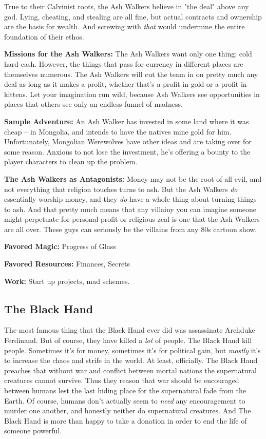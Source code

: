 True to their Calvinist roots, the Ash Walkers believe in "the deal" above any god. Lying, cheating, and stealing are all fine, but actual contracts and ownership are the basis for wealth. And screwing with \textit{that} would undermine the entire foundation of their ethos.

\textbf{Missions for the Ash Walkers:} The Ash Walkers want only one thing: cold hard cash. However, the things that pass for currency in different places are themselves numerous. The Ash Walkers will cut the team in on pretty much any deal as long as it makes a profit, whether that's a profit in gold or a profit in kittens. Let your imagination run wild, because Ash Walkers see opportunities in places that others see only an endless funnel of madness.

\textbf{Sample Adventure:} An Ash Walker has invested in some land where it was cheap -- in Mongolia, and intends to have the natives mine gold for him. Unfortunately, Mongolian Werewolves have other ideas and are taking over for some reason. Anxious to not lose the investment, he's offering a bounty to the player characters to clean up the problem.

\textbf{The Ash Walkers as Antagonists:} Money may not be the root of all evil, and not everything that religion touches turns to ash. But the Ash Walkers \textit{do} essentially worship money, and they \textit{do} have a whole thing about turning things to ash. And that pretty much means that any villainy you can imagine someone might perpetuate for personal profit or religious zeal is one that the Ash Walkers are all over. These guys can seriously be the villains from any 80s cartoon show.

\textbf{Favored Magic:}  Progress of Glass

\textbf{Favored Resources:} Finances, Secrets

\textbf{Work:} Start up projects, mad schemes.

\subsection{The Black Hand} 

The most famous thing that the Black Hand ever did was assassinate Archduke Ferdinand. But of course, they have killed a \textit{lot} of people. The Black Hand kill people. Sometimes it's for money, sometimes it's for political gain, but \textit{mostly} it's to increase the chaos and strife in the world. At least, officially. The Black Hand preaches that without war and conflict between mortal nations the supernatural creatures cannot survive. Thus they reason that war should be encouraged between humans lest the last hiding place for the supernatural fade from the Earth. Of course, humans don't actually seem to \textit{need} any encouragement to murder one another, and honestly neither do supernatural creatures. And The Black Hand is more than happy to take a donation in order to end the life of someone powerful.

